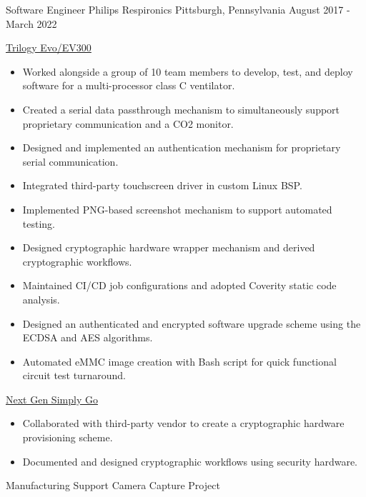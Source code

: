 \begin{cventries}
\cventry
  {Software Engineer} %
  {Philips Respironics} %
  {Pittsburgh, Pennsylvania} %
  {August 2017 - March 2022} %
  {
    \begin{cvitems}
    \item
    {
      \href{https://www.usa.philips.com/healthcare/product/HC0055500/trilogy-evo-portable-hospital-to-home-ventilator}{\color{RoyalBlue}Trilogy Evo/EV300}
      \begin{itemize}
        \item Worked alongside a group of 10 team members to develop, test, and deploy software for a multi-processor class C ventilator.
        \item Created a serial data passthrough mechanism to simultaneously support proprietary communication and a CO2 monitor.
        \item Designed and implemented an authentication mechanism for proprietary serial communication.
        \item Integrated third-party touchscreen driver in custom Linux BSP.
        \item Implemented PNG-based screenshot mechanism to support automated testing.
        \item Designed cryptographic hardware wrapper mechanism and derived cryptographic workflows.
        \item Maintained CI/CD job configurations and adopted Coverity static code analysis.
        \item Designed an authenticated and encrypted software upgrade scheme using the ECDSA and AES algorithms.
        \item Automated eMMC image creation with Bash script for quick functional circuit test turnaround.
      \end{itemize}
    }
    \item
    {
      \href{https://www.usa.philips.com/healthcare/product/HCNOCTN350/simplygo-mini-portable-oxygen-concentrator-poc}{\color{RoyalBlue}Next Gen Simply Go}
      \begin{itemize}
        \item Collaborated with third-party vendor to create a cryptographic hardware provisioning scheme.
        \item Documented and designed cryptographic workflows using security hardware.
      \end{itemize} 
    }
    \item
    {
      {Manufacturing Support Camera Capture Project}
      \begin{itemize}

\end{itemize}}
\end{cvitems}}
\end{cventries}
